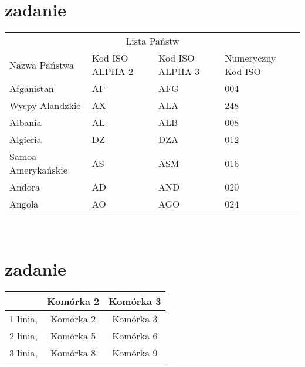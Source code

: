 \documentclass[12pt,a4paper]{article}
\begin{document}
\begin{center}
		\section{zadanie}
		\begin{tabular}{|p{4cm}||p{2cm}|p{2cm}|p{2cm}|}
			\hline
			\cline{1-4} 
			\multicolumn{4}{|c|}{Lista Państw}\\
			\cline{1-4}
			Nazwa Państwa & Kod ISO ALPHA 2 & Kod ISO ALPHA 3 & Numeryczny Kod ISO\\
			\hline
			Afganistan & AF & AFG & 004\\
			Wyspy Alandzkie & AX & ALA & 248\\
			Albania & AL & ALB & 008\\
			Algieria & DZ & DZA & 012\\
			Samoa Amerykańskie & AS & ASM & 016\\
			Andora & AD & AND & 020\\
			Angola & AO & AGO & 024\\
			\hline			
			
		\end{tabular}\\
		\vspace{1cm}
		\section{zadanie}
		\begin{tabular}{|c|c|c|}
			\hline	
			\multirow { 2}{*}{}  Komórka 1 & Komórka 2 & Komórka 3\\ \hline 
			1 linia, & Komórka 2 & Komórka 3 \\ 2 linia, & Komórka 5 & Komórka 6 \\ 3 linia, & Komórka 8  & Komórka 9\\ \hline
		\end{tabular}
		\vspace{1cm}

\end{center}
\end{document}
